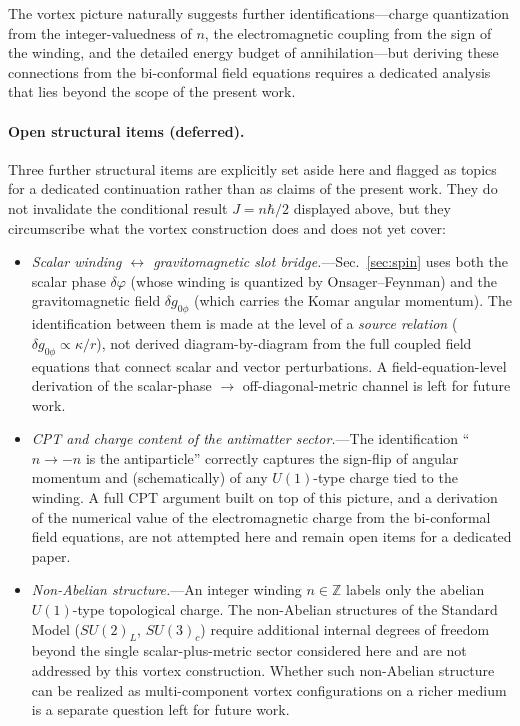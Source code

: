 \documentclass[aps,prd,onecolumn,superscriptaddress,nofootinbib,showpacs,12pt,notitlepage]{revtex4-2}
\begin{document}
The vortex picture naturally suggests further
identifications---charge quantization from the
integer-valuedness of $n$, the electromagnetic coupling
from the sign of the winding, and the detailed energy
budget of annihilation---but deriving these connections
from the bi-conformal field equations requires a dedicated
analysis that lies beyond the scope of the present work.

\paragraph{Open structural items (deferred).}
Three further structural items are explicitly set aside
here and flagged as topics for a dedicated continuation
rather than as claims of the present work.  They do not
invalidate the conditional result $J = n\hbar/2$ displayed
above, but they circumscribe what the vortex construction
does and does not yet cover:
\begin{itemize}
  \item \emph{Scalar winding $\leftrightarrow$
    gravitomagnetic slot bridge.}---Sec.~\ref{sec:spin}
    uses both the scalar phase $\delta\varphi$ (whose
    winding is quantized by Onsager--Feynman) and the
    gravitomagnetic field $\delta g_{0\phi}$ (which
    carries the Komar angular momentum).  The
    identification between them is made at the level of
    a \emph{source relation}
    ($\delta g_{0\phi}\propto\kappa/r$), not derived
    diagram-by-diagram from the full coupled field
    equations that connect scalar and vector
    perturbations.  A field-equation-level derivation
    of the scalar-phase $\to$ off-diagonal-metric
    channel is left for future work.
  \item \emph{CPT and charge content of the
    antimatter sector.}---The identification
    ``$n\to -n$ is the antiparticle'' correctly captures
    the sign-flip of angular momentum and (schematically)
    of any $U(1)$-type charge tied to the winding.  A
    full CPT argument built on top of this picture, and
    a derivation of the numerical value of the
    electromagnetic charge from the bi-conformal field
    equations, are not attempted here and remain open
    items for a dedicated paper.
  \item \emph{Non-Abelian structure.}---An integer
    winding $n\in\mathbb{Z}$ labels only the abelian
    $U(1)$-type topological charge.  The non-Abelian
    structures of the Standard Model
    ($SU(2)_{L}$, $SU(3)_{c}$) require additional
    internal degrees of freedom beyond the single
    scalar-plus-metric sector considered here and are
    not addressed by this vortex construction.  Whether
    such non-Abelian structure can be realized as
    multi-component vortex configurations on a richer
    medium is a separate question left for future work.
\end{itemize}
\end{document}
